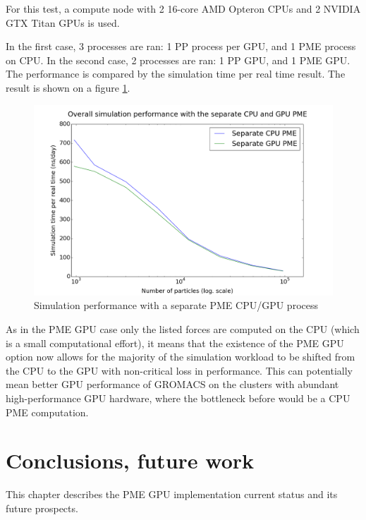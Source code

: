 \documentclass[12pt,a4paper]{report}
\newcommand{\draft}[1]{#1}
\begin{document}
For this test, a compute node with 2 16-core AMD Opteron CPUs and 2 NVIDIA GTX Titan GPUs is used.

In the first case, 3 processes are ran: 1 PP process per GPU, and 1 PME process on CPU. In the second case, 2 processes are ran: 1 PP GPU, and 1 PME GPU. The performance is compared by the simulation time per real time result. The result is shown on a figure \ref{fig:sepGPU}.


\FloatBarrier
\begin{figure} [h!]
    \centering
    \includegraphics[width=1\textwidth]{pics/GPUCPU.png}
    \caption{Simulation performance with a separate PME CPU/GPU process}
    \label{fig:sepGPU}
\end{figure}
\FloatBarrier

As in the PME GPU case only the listed forces are computed on the CPU (which is a small computational effort), it means that the existence of the PME GPU option now allows for the majority of the simulation workload to be shifted from the CPU to the GPU with non-critical loss in performance. This can potentially mean better GPU performance of GROMACS on the clusters with abundant high-performance GPU hardware, where the bottleneck before would be a CPU PME computation.
\fi





\newpage
\chapter{Conclusions, future work}
This chapter describes the PME GPU implementation current status and its future prospects.
\end{document}
